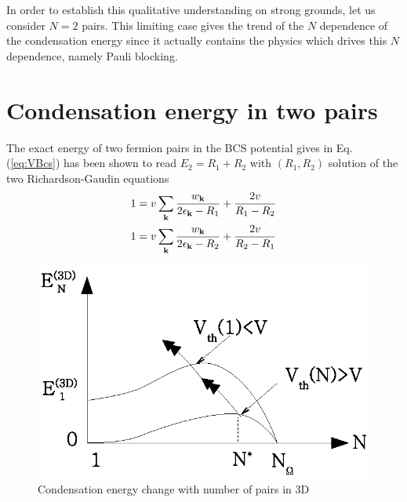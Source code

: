 \documentclass{article}
\begin{document}
In order to establish this qualitative understanding on strong grounds, let us consider $N=2$ pairs. This limiting case gives the trend of the $N$ dependence of the condensation energy since it actually contains the physics which drives this $N$ dependence, namely Pauli blocking.  


\section{Condensation energy in two pairs\label{sec:twoPair}}
The exact energy of two fermion pairs in the BCS potential gives in Eq. (\ref{eq:VBcs}) has been shown to read $E_2=R_1+R_2$ with $(R_1,R_2)$ solution of the two Richardson-Gaudin equations
\begin{equation}
\begin{split}
1&=v\sum_{\mathbf{k}}\frac{w_{\mathbf{k}}}{2\epsilon_{\mathbf{k}}-R_1}+\frac{2v}{R_1-R_2}\\
1&=v\sum_{\mathbf{k}}\frac{w_{\mathbf{k}}}{2\epsilon_{\mathbf{k}}-R_2}+\frac{2v}{R_2-R_1}
\end{split}
\label{eq:richardsonEq}
\end{equation}

\begin{figure}[htb]
	\centering
		\includegraphics{3dCondChange.eps}
	\caption{Condensation energy change with number of pairs in 3D}
	\label{fig:3dCondChange}
\end{figure}
\end{document}
